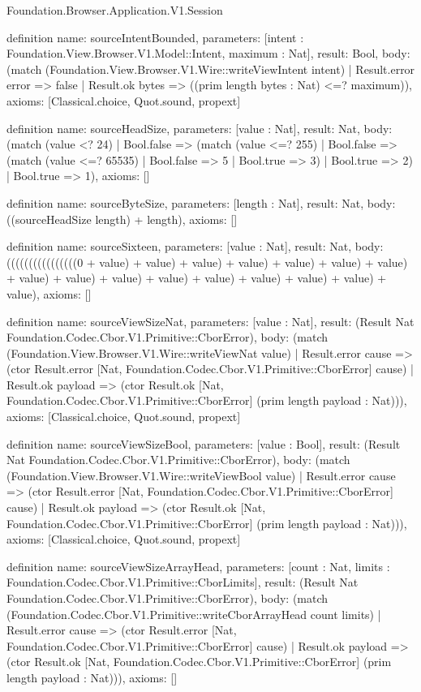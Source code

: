 \begin{lexlean}{Foundation.Browser.Application.V1.Session}
\begin{semanticmodule}
definition{
  name: sourceIntentBounded,
  parameters: [intent : Foundation.View.Browser.V1.Model::Intent, maximum : Nat],
  result: Bool,
  body: (match (Foundation.View.Browser.V1.Wire::writeViewIntent intent)
    | Result.error error => false
    | Result.ok bytes => ((prim length bytes : Nat) <=? maximum)),
  axioms: [Classical.choice, Quot.sound, propext]
}

definition{
  name: sourceHeadSize,
  parameters: [value : Nat],
  result: Nat,
  body: (match (value <? 24)
    | Bool.false => (match (value <=? 255)
      | Bool.false => (match (value <=? 65535) | Bool.false => 5 | Bool.true => 3)
      | Bool.true => 2)
    | Bool.true => 1),
  axioms: []
}

definition{
  name: sourceByteSize,
  parameters: [length : Nat],
  result: Nat,
  body: ((sourceHeadSize length) + length),
  axioms: []
}

definition{
  name: sourceSixteen,
  parameters: [value : Nat],
  result: Nat,
  body: ((((((((((((((((0 + value) + value) + value) + value) + value) + value) + value) + value) + value) + value) + value) + value) + value) + value) + value) + value),
  axioms: []
}

definition{
  name: sourceViewSizeNat,
  parameters: [value : Nat],
  result: (Result Nat Foundation.Codec.Cbor.V1.Primitive::CborError),
  body: (match (Foundation.View.Browser.V1.Wire::writeViewNat value)
    | Result.error cause => (ctor Result.error [Nat, Foundation.Codec.Cbor.V1.Primitive::CborError] cause)
    | Result.ok payload => (ctor Result.ok [Nat, Foundation.Codec.Cbor.V1.Primitive::CborError] (prim length payload : Nat))),
  axioms: [Classical.choice, Quot.sound, propext]
}

definition{
  name: sourceViewSizeBool,
  parameters: [value : Bool],
  result: (Result Nat Foundation.Codec.Cbor.V1.Primitive::CborError),
  body: (match (Foundation.View.Browser.V1.Wire::writeViewBool value)
    | Result.error cause => (ctor Result.error [Nat, Foundation.Codec.Cbor.V1.Primitive::CborError] cause)
    | Result.ok payload => (ctor Result.ok [Nat, Foundation.Codec.Cbor.V1.Primitive::CborError] (prim length payload : Nat))),
  axioms: [Classical.choice, Quot.sound, propext]
}

definition{
  name: sourceViewSizeArrayHead,
  parameters: [count : Nat, limits : Foundation.Codec.Cbor.V1.Primitive::CborLimits],
  result: (Result Nat Foundation.Codec.Cbor.V1.Primitive::CborError),
  body: (match (Foundation.Codec.Cbor.V1.Primitive::writeCborArrayHead count limits)
    | Result.error cause => (ctor Result.error [Nat, Foundation.Codec.Cbor.V1.Primitive::CborError] cause)
    | Result.ok payload => (ctor Result.ok [Nat, Foundation.Codec.Cbor.V1.Primitive::CborError] (prim length payload : Nat))),
  axioms: []
}


\end{semanticmodule}
\end{lexlean}
